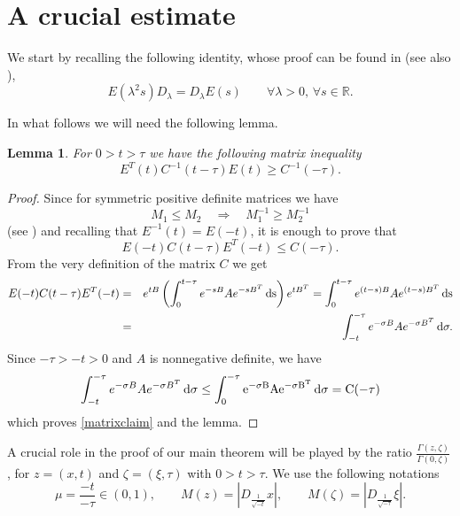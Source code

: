 \documentclass[10pt]{amsart}
\def\erre{\mathbb{R}}
\newtheorem{lemma}[theorem]{Lemma}
\numberwithin{equation}{section}
\begin{document}
\section{A crucial estimate}\label{crucialestimate}
We start by recalling the following identity, whose proof can be found in \cite[Remark 2.1]{LP} (see also \cite{K82}),
\begin{equation}\label{commu}
E(\lambda^2 s)D_\lambda=D_\lambda E(s)\qquad \forall \lambda>0,\, \forall s\in\erre.
\end{equation}

In what follows we will need the following lemma.
\begin{lemma}\label{matinv}
For $0>t>\tau$ we have the following matrix inequality
$$E^T(t)C^{-1}(t-\tau)E(t)\geq C^{-1}(-\tau).$$
\end{lemma}
\begin{proof}
Since for symmetric positive definite matrices we have
$$M_1\leq M_2\quad \Rightarrow\quad M_1^{-1}\geq M_2^{-1}$$
(see \cite[Corollary 7.7.4]{HJ}) and recalling that $E^{-1}(t)=E(-t)$, it is enough to prove that
\begin{equation}\label{matrixclaim}
E(-t)C(t-\tau)E^T(-t)\leq C(-\tau).
\end{equation}
From the very definition of the matrix $C$ we get
\begin{eqnarray*}
E(-t)C(t-\tau)E^T(-t)&=&e^{tB}\left(\int_{0}^{t-\tau}{e^{-sB}Ae^{-sB^T}}\,\rm{d}s\right)e^{tB^T}=\int_{0}^{t-\tau}{e^{(t-s)B}Ae^{(t-s)B^T}}\,\rm{d}s\\
&=&\int_{-t}^{-\tau}{e^{-\sigma B}Ae^{-\sigma B^T}}\,\rm{d}\sigma.
\end{eqnarray*}
Since $-\tau>-t>0$ and $A$ is nonnegative definite, we have 
$$\int_{-t}^{-\tau}{e^{-\sigma B}Ae^{-\sigma B^T}}\,\rm{d}\sigma\leq \int_{0}^{-\tau}{e^{-\sigma B}Ae^{-\sigma B^T}}\,\rm{d}\sigma = C(-\tau)$$
which proves \eqref{matrixclaim} and the lemma.
\end{proof}

A crucial role in the  proof  of our main theorem will be played by the ratio $\frac{\Gamma(z,\zeta)}{\Gamma(0,\zeta)}$, for $z=(x,t)$ and $\zeta=(\xi,\tau)$ with $0>t>\tau$. We use the following notations
$$\mu=\frac{-t}{-\tau}\in(0,1),\qquad M(z)=\left|D_{\frac{1}{\sqrt{-t}}}x\right|,\qquad M(\zeta)=\left|D_{\frac{1}{\sqrt{-\tau}}}\xi\right|.$$
\end{document}
